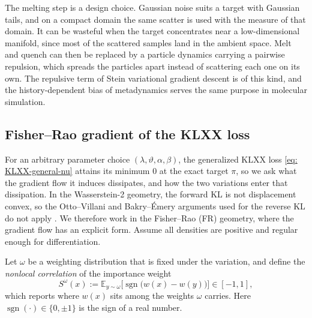\documentclass{article}
\begin{document}
\begin{remark}
	The melting step is a design choice. Gaussian noise suits a target with Gaussian tails, and on a compact domain the same scatter is used with the measure of that domain. It can be wasteful when the target concentrates near a low-dimensional manifold, since most of the scattered samples land in the ambient space. Melt and quench can then be replaced by a particle dynamics carrying a pairwise repulsion, which spreads the particles apart instead of scattering each one on its own. The repulsive term of Stein variational gradient descent \citep{liu2016stein} is of this kind, and the history-dependent bias of metadynamics \citep{laio2002escaping} serves the same purpose in molecular simulation.
\end{remark}

\subsection{Fisher--Rao gradient of the KLXX loss}
\label{subsec: FR-convergence}

For an arbitrary parameter choice $(\lambda,\vartheta,\alpha,\beta)$, the generalized KLXX loss \eqref{eq: KLXX-general-nu} attains its minimum $0$ at the exact target $\pi$, so we ask what the gradient flow it induces dissipates, and how the two variations enter that dissipation.
In the Wasserstein-2 geometry, the forward KL is not displacement convex, so the Otto--Villani and Bakry--{\'E}mery arguments used for the reverse KL do not apply \citep{otto2000generalization,bakry2014analysis}. We therefore work in the Fisher--Rao (FR) geometry, where the gradient flow has an explicit form. Assume all densities are positive and regular enough for differentiation.

Let $\omega$ be a weighting distribution that is fixed under the variation, and define the \emph{nonlocal correlation} of the importance weight
\begin{equation}
	S^{\omega}(x) := \mathbb E_{y\sim\omega}\bigl[\operatorname{sgn}\bigl(w(x)-w(y)\bigr)\bigr] \in [-1,1],
	\label{eq: FR-S}
\end{equation}
which reports where $w(x)$ sits among the weights $\omega$ carries. Here $\operatorname{sgn}(\cdot)\in\{0,\pm1\}$ is the sign of a real number.
\end{document}
